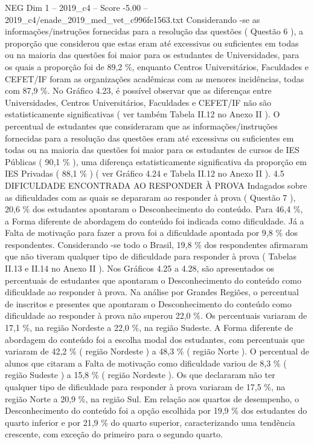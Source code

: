 \begin{textsample}{NEG Dim 1 – 2019\_c4 – Score -5.00 – 2019\_c4/enade\_2019\_med\_vet\_c996fe1563.txt}
Considerando -se as informações/instruções fornecidas para a resolução das questões ( Questão 6 ), a proporção que considerou que estas eram até excessivas ou suficientes em todas ou na maioria das questões foi maior para os estudantes de Universidades, para os quais a proporção foi de 89,2 \%, enquanto Centros Universitários, Faculdades e CEFET/IF foram as organizações acadêmicas com as menores incidências, todas com 87,9 \%.
No Gráfico 4.23, é possível observar que as diferenças entre Universidades, Centros Universitários, Faculdades e CEFET/IF não são estatisticamente significativas ( ver também Tabela II.12 no Anexo II ).
O percentual de estudantes que consideraram que as informações/instruções fornecidas para a resolução das questões eram até excessivas ou suficientes em todas ou na maioria das questões foi maior para os estudantes de cursos de IES Públicas ( 90,1 \% ), uma diferença estatisticamente significativa da proporção em IES Privadas ( 88,1 \% ) ( ver Gráfico 4.24 e Tabela II.12 no Anexo II ). 4.5 DIFICULDADE ENCONTRADA AO RESPONDER À PROVA Indagados sobre as dificuldades com as quais se depararam ao responder à prova ( Questão 7 ), 20,6 \% dos estudantes apontaram o Desconhecimento do conteúdo.
Para 46,4 \%, a Forma diferente de abordagem do conteúdo foi indicada como dificuldade.
Já a Falta de motivação para fazer a prova foi a dificuldade apontada por 9,8 \% dos respondentes.
Considerando -se todo o Brasil, 19,8 \% dos respondentes afirmaram que não tiveram qualquer tipo de dificuldade para responder à prova ( Tabelas II.13 e II.14 no Anexo II ).
Nos Gráficos 4.25 a 4.28, são apresentados os percentuais de estudantes que apontaram o Desconhecimento do conteúdo como dificuldade ao responder à prova.
Na análise por Grandes Regiões, o percentual de inscritos e presentes que apontaram o Desconhecimento do conteúdo como dificuldade ao responder à prova não superou 22,0 \%.
Os percentuais variaram de 17,1 \%, na região Nordeste a 22,0 \%, na região Sudeste.
A Forma diferente de abordagem do conteúdo foi a escolha modal dos estudantes, com percentuais que variaram de 42,2 \% ( região Nordeste ) a 48,3 \% ( região Norte ).
O percentual de alunos que citaram a Falta de motivação como dificuldade variou de 8,3 \% ( região Sudeste ) a 15,8 \% ( região Nordeste ).
Os que declararam não ter qualquer tipo de dificuldade para responder à prova variaram de 17,5 \%, na região Norte a 20,9 \%, na região Sul.
Em relação aos quartos de desempenho, o Desconhecimento do conteúdo foi a opção escolhida por 19,9 \% dos estudantes do quarto inferior e por 21,9 \% do quarto superior, caracterizando uma tendência crescente, com exceção do primeiro para o segundo quarto.

\end{textsample}
